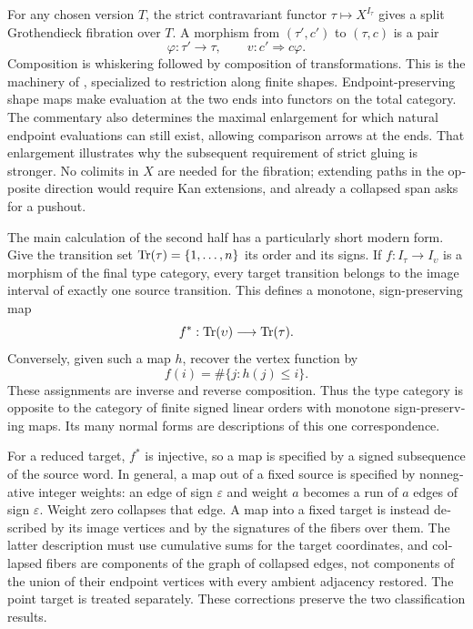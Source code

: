 \begin{otherlanguage}{english}
For any chosen version $T$, the strict contravariant functor $\tau\mapsto X^{I_\tau}$ gives a split Grothendieck fibration over $T$. A morphism from $(\tau',c')$ to $(\tau,c)$ is a pair
\[
 \varphi:\tau'\to\tau,
 \qquad v:c'\Rightarrow c\varphi.
\]
Composition is whiskering followed by composition of transformations. This is the machinery of \citet[Expos\'e~VI, \S\S8--10]{GrothendieckSGA1}, specialized to restriction along finite shapes. Endpoint-preserving shape maps make evaluation at the two ends into functors on the total category. The commentary also determines the maximal enlargement for which natural endpoint evaluations can still exist, allowing comparison arrows at the ends. That enlargement illustrates why the subsequent requirement of strict gluing is stronger. No colimits in $X$ are needed for the fibration; extending paths in the opposite direction would require Kan extensions, and already a collapsed span asks for a pushout.

The main calculation of the second half has a particularly short modern form. Give the transition set $\mathrm{Tr}(\tau)=\{1,\ldots,n\}$ its order and its signs. If $f:I_\tau\to I_\upsilon$ is a morphism of the final type category, every target transition belongs to the image interval of exactly one source transition. This defines a monotone, sign-preserving map
\[
 f^*:\mathrm{Tr}(\upsilon)\longrightarrow\mathrm{Tr}(\tau).
\]
Conversely, given such a map $h$, recover the vertex function by
\[
 f(i)=\#\{j:h(j)\leq i\}.
\]
These assignments are inverse and reverse composition. Thus the type category is opposite to the category of finite signed linear orders with monotone sign-preserving maps. Its many normal forms are descriptions of this one correspondence.

For a reduced target, $f^*$ is injective, so a map is specified by a signed subsequence of the source word. In general, a map out of a fixed source is specified by nonnegative integer weights: an edge of sign $\varepsilon$ and weight $a$ becomes a run of $a$ edges of sign $\varepsilon$. Weight zero collapses that edge. A map into a fixed target is instead described by its image vertices and by the signatures of the fibers over them. The latter description must use cumulative sums for the target coordinates, and collapsed fibers are components of the graph of collapsed edges, not components of the union of their endpoint vertices with every ambient adjacency restored. The point target is treated separately. These corrections preserve the two classification results.


\end{otherlanguage}
